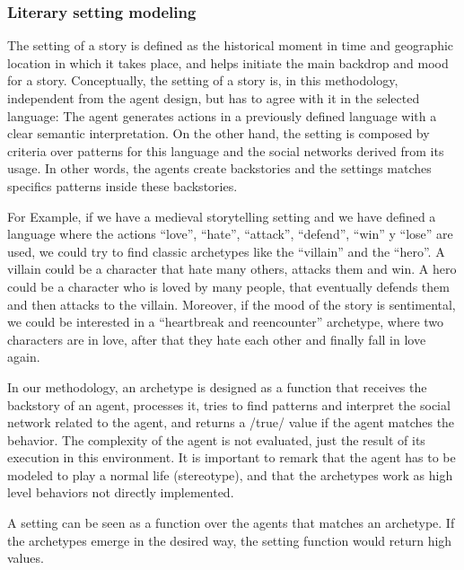 \documentclass[letterpaper]{article}
\begin{document}
\subsubsection{Literary setting modeling}


The setting of a story is defined as the historical moment in time and geographic location in which it takes place, and helps initiate the main backdrop and mood for a story.
Conceptually, the setting of a story is, in this methodology, independent from the agent design, but has to agree with it in the selected language: 
The agent generates actions in a previously defined language with a clear semantic interpretation. On the other hand, the setting is composed by criteria over patterns for this language and the social networks derived from its usage. In other words, the agents create backstories and the settings matches specifics patterns inside these backstories.

For Example, if we have a medieval storytelling setting and we have defined a language where the actions ``love'', ``hate'', ``attack'', ``defend'', ``win'' y ``lose'' are used, we could try to find classic 
archetypes like the ``villain'' and the ``hero''. A villain could be a character that hate many others, attacks them and win. A hero could be a character who is loved by many people, that eventually defends them and then attacks to the villain. Moreover, if the mood of the story is sentimental, we could be interested in a ``heartbreak and reencounter'' archetype, where two characters are in love, after that they hate each other and finally fall in love again.

In our methodology, an archetype is designed as a function that receives the backstory of an agent, processes it, tries to find patterns and interpret the social network related to the agent, and returns a /true/ value if the agent matches the behavior. 
The complexity of the agent is not evaluated, just the result of its execution in this environment. It is important to remark that the agent has to be modeled to play a normal life (stereotype), and that the archetypes work as high level behaviors not directly implemented.

A setting can be seen as a function over the agents that matches an archetype. If the archetypes emerge in the desired way, the setting function would return high values.
\end{document}
